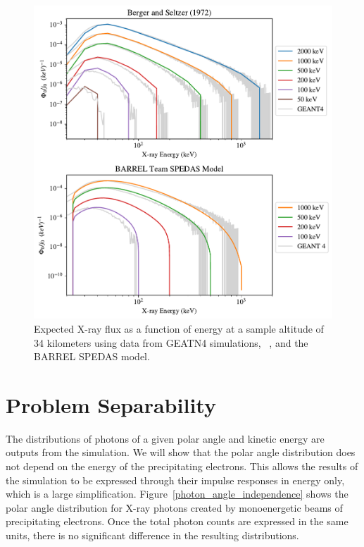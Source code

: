 \begin{figure}[p]
\label{barrel_berger_spedas_comparison_34}
\includegraphics[width=\textwidth]{figures/chapter_3/barrel_berger_spedas_comparison/barrel_berger_spedas_comparison_alt_40km_3}
\caption{Expected X-ray flux as a function of energy at a sample altitude of 34 kilometers using data from GEATN4 simulations, ~\cite{Berger1972}, and the BARREL SPEDAS model.}
\end{figure}

\section{Problem Separability}

The distributions of photons of a given polar angle and kinetic energy are outputs from the simulation. We will show that the polar angle distribution does not depend on the energy of the precipitating electrons. This allows the results of the simulation to be expressed through their impulse responses in energy only, which is a large simplification. Figure~\ref{photon_angle_independence} shows the polar angle distribution for X-ray photons created by monoenergetic beams of precipitating electrons. Once the total photon counts are expressed in the same units, there is no significant difference in the resulting distributions.

